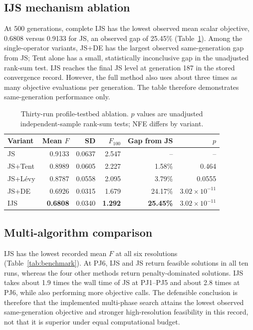 \documentclass[preprint,12pt]{elsarticle}
\begin{document}
\subsection{IJS mechanism ablation}\label{sec:ablation}

At 500 generations, complete IJS has the lowest observed mean scalar objective, 0.6808 versus 0.9133 for JS, an observed gap of 25.45\% (Table~\ref{tab:ablation}). Among the single-operator variants, JS+DE has the largest observed same-generation gap from JS; Tent alone has a small, statistically inconclusive gap in the unadjusted rank-sum test. IJS reaches the final JS level at generation 187 in the stored convergence record. However, the full method also uses about three times as many objective evaluations per generation. The table therefore demonstrates same-generation performance only.

\begin{table}[t]
\centering
\caption{Thirty-run profile-testbed ablation. $p$ values are unadjusted independent-sample rank-sum tests; NFE differs by variant.}
\label{tab:ablation}
\begin{tabular}{lrrrrr}
\toprule
Variant & Mean $F$ & SD & $F_{100}$ & Gap from JS & $p$ \\
\midrule
JS & 0.9133 & 0.0637 & 2.547 & -- & -- \\
JS+Tent & 0.8989 & 0.0605 & 2.227 & 1.58\% & 0.464 \\
JS+L\'evy & 0.8787 & 0.0558 & 2.095 & 3.79\% & 0.0555 \\
JS+DE & 0.6926 & 0.0315 & 1.679 & 24.17\% & $3.02\times10^{-11}$ \\
IJS & \textbf{0.6808} & 0.0340 & \textbf{1.292} & \textbf{25.45\%} & $3.02\times10^{-11}$ \\
\bottomrule
\end{tabular}
\end{table}

\subsection{Multi-algorithm comparison}

IJS has the lowest recorded mean $F$ at all six resolutions (Table~\ref{tab:benchmark}). At PJ6, IJS and JS return feasible solutions in all ten runs, whereas the four other methods return penalty-dominated solutions. IJS takes about 1.9 times the wall time of JS at PJ1--PJ5 and about 2.8 times at PJ6, while also performing more objective calls. The defensible conclusion is therefore that the implemented multi-phase search attains the lowest observed same-generation objective and stronger high-resolution feasibility in this record, not that it is superior under equal computational budget.
\end{document}
